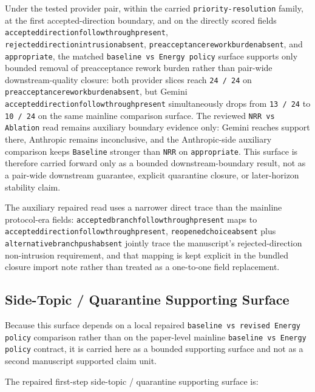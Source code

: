 \documentclass[11pt]{article}
\renewcommand{\_}{\textunderscore\hspace{0pt}}
\renewenvironment{quote}
  {\list{}{\leftmargin1em\rightmargin1em}\item\relax\small\sloppy}
  {\endlist}
\begin{document}
\begin{quote}
Under the tested provider pair, within the carried \texttt{priority-resolution}
family, at the first accepted-direction boundary, and on the directly scored fields
\texttt{accepted\_direction\_followthrough\_present},
\texttt{rejected\_direction\_intrusion\_absent},
\texttt{preacceptance\_rework\_burden\_absent}, and \texttt{appropriate}, the
matched \texttt{baseline vs Energy policy} surface supports only bounded
removal of preacceptance rework burden rather than pair-wide downstream-quality
closure: both provider slices reach \texttt{24 / 24} on
\texttt{preacceptance\_rework\_burden\_absent}, but Gemini
\texttt{accepted\_direction\_followthrough\_present} simultaneously drops from
\texttt{13 / 24} to \texttt{10 / 24} on the same mainline comparison surface.
The
reviewed \texttt{NRR vs Ablation} read remains auxiliary boundary evidence
only: Gemini reaches support there, Anthropic remains inconclusive, and the
Anthropic-side auxiliary comparison keeps \texttt{Baseline} stronger than
\texttt{NRR} on \texttt{appropriate}. This surface is therefore carried forward
only as a bounded downstream-boundary result, not as a pair-wide downstream
guarantee, explicit quarantine closure, or later-horizon stability claim.
\end{quote}

The auxiliary repaired read uses a narrower direct trace than the mainline
protocol-era fields: \texttt{accepted\_branch\_followthrough\_present} maps to
\texttt{accepted\_direction\_followthrough\_present},
\texttt{reopened\_choice\_absent} plus
\texttt{alternative\_branch\_push\_absent} jointly trace the manuscript's
rejected-direction non-intrusion requirement, and that mapping is kept explicit
in the bundled closure import note rather than treated as a one-to-one field
replacement.

\subsection{Side-Topic / Quarantine Supporting Surface}

Because this surface depends on a local repaired
\texttt{baseline vs revised Energy policy} comparison rather than on the
paper-level mainline \texttt{baseline vs Energy policy} contract, it is carried
here as a bounded supporting surface and not as a second manuscript supported
claim unit.

The repaired first-step side-topic / quarantine supporting surface is:
\end{document}
